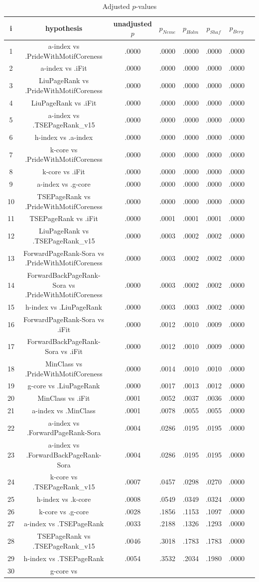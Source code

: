 \documentclass[a4paper,10pt]{article}
\begin{document}
\begin{landscape}
\begin{table}[!htp]
\centering\tiny
\caption{Adjusted $p$-values}
\begin{tabular}{cccccccc}
i&hypothesis&unadjusted $p$&$p_{Neme}$&$p_{Holm}$&$p_{Shaf}$&$p_{Berg}$\\
\hline
1&a-index vs .PrideWithMotifCoreness&.0000&.0000&.0000&.0000&.0000\\2&a-index vs .iFit&.0000&.0000&.0000&.0000&.0000\\3&LiuPageRank vs .PrideWithMotifCoreness&.0000&.0000&.0000&.0000&.0000\\4&LiuPageRank vs .iFit&.0000&.0000&.0000&.0000&.0000\\5&a-index vs .TSEPageRank_v15&.0000&.0000&.0000&.0000&.0000\\6&h-index vs .a-index&.0000&.0000&.0000&.0000&.0000\\7&k-core vs .PrideWithMotifCoreness&.0000&.0000&.0000&.0000&.0000\\8&k-core vs .iFit&.0000&.0000&.0000&.0000&.0000\\9&a-index vs .g-core&.0000&.0000&.0000&.0000&.0000\\10&TSEPageRank vs .PrideWithMotifCoreness&.0000&.0000&.0000&.0000&.0000\\11&TSEPageRank vs .iFit&.0000&.0001&.0001&.0001&.0000\\12&LiuPageRank vs .TSEPageRank_v15&.0000&.0003&.0002&.0002&.0000\\13&ForwardPageRank-Sora vs .PrideWithMotifCoreness&.0000&.0003&.0002&.0002&.0000\\14&ForwardBackPageRank-Sora vs .PrideWithMotifCoreness&.0000&.0003&.0002&.0002&.0000\\15&h-index vs .LiuPageRank&.0000&.0003&.0003&.0002&.0000\\16&ForwardPageRank-Sora vs .iFit&.0000&.0012&.0010&.0009&.0000\\17&ForwardBackPageRank-Sora vs .iFit&.0000&.0012&.0010&.0009&.0000\\18&MinClass vs .PrideWithMotifCoreness&.0000&.0014&.0010&.0010&.0000\\19&g-core vs .LiuPageRank&.0000&.0017&.0013&.0012&.0000\\20&MinClass vs .iFit&.0001&.0052&.0037&.0036&.0000\\21&a-index vs .MinClass&.0001&.0078&.0055&.0055&.0000\\22&a-index vs .ForwardPageRank-Sora&.0004&.0286&.0195&.0195&.0000\\23&a-index vs .ForwardBackPageRank-Sora&.0004&.0286&.0195&.0195&.0000\\24&k-core vs .TSEPageRank_v15&.0007&.0457&.0298&.0270&.0000\\25&h-index vs .k-core&.0008&.0549&.0349&.0324&.0000\\26&k-core vs .g-core&.0028&.1856&.1153&.1097&.0000\\27&a-index vs .TSEPageRank&.0033&.2188&.1326&.1293&.0000\\28&TSEPageRank vs .TSEPageRank_v15&.0046&.3018&.1783&.1783&.0000\\29&h-index vs .TSEPageRank&.0054&.3532&.2034&.1980&.0000\\30&g-core vs 
\end{tabular}
\end{table}
\end{landscape}
\end{document}
